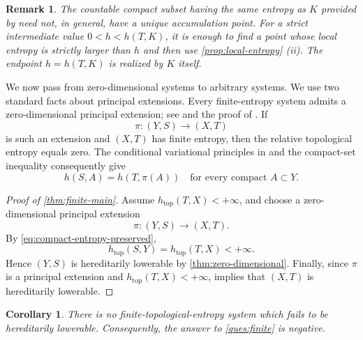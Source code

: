 \documentclass[10pt,a4paper]{amsart}
\newcommand{\htop}{h_{\mathrm{top}}}
\newtheorem{corollary}[theorem]{Corollary}
\newtheorem{remark}[theorem]{Remark}
\numberwithin{equation}{section}
\begin{document}
	\begin{remark}
		The countable compact subset having the same entropy as $K$ provided by
		\cite[Theorem~5.1(3)]{HYZ2010}need not, in general, have a unique
		accumulation point.  For a strict intermediate value
		$0<h<h(T,K)$, it is enough to find a point whose local entropy is strictly
		larger than $h$ and then use \cref{prop:local-entropy} (ii). The endpoint
		$h=h(T,K)$ is realized by $K$ itself.
	\end{remark}
	
	We now pass from zero-dimensional systems to arbitrary systems. We use two
	standard facts about principal extensions. Every finite-entropy system admits
	a zero-dimensional principal extension; see
	\cite{BoyleDownarowicz2004,DownarowiczHuczek2013} and the proof
	of \cite[Theorem~3.8]{HYZ2014}. If
	\[
	\pi\colon(Y,S)\longrightarrow(X,T)
	\]
	is such an extension and $(X,T)$ has finite entropy, then the relative
	topological entropy equals zero. The conditional variational principles in
	\cite{LedrappierWalters1977,DownarowiczSerafin2002} and the compact-set
	inequality \cite[Proposition~7.3]{HYZ2010} consequently give
	\begin{equation}
		h(S,A)=h(T,\pi(A))
		\quad\text{for every compact }A\subset Y.
		\label{eq:compact-entropy-preserved}
	\end{equation}
	
	\begin{proof}[Proof of \cref{thm:finite-main}]
		Assume $\htop(T,X)<+\infty$, and choose a zero-dimensional principal
		extension
		\[
		\pi\colon(Y,S)\longrightarrow(X,T).
		\]
		By \eqref{eq:compact-entropy-preserved},
		\[
		\htop(S,Y)=\htop(T,X)<+\infty.
		\]
		Hence $(Y,S)$ is hereditarily lowerable by
		\cref{thm:zero-dimensional}.  Finally, since $\pi$ is a principal
		extension and $\htop(T,X)<+\infty$,
		\cite[Proposition~7.8 (2)]{HYZ2010} implies that $(X,T)$ is
		hereditarily lowerable.
	\end{proof}
	
	\begin{corollary}
		\label{cor:question}
		There is no finite-topological-entropy system which fails to be hereditarily
		lowerable. Consequently, the answer to \cref{ques:finite} is negative.
	\end{corollary}
	
	
\end{document}

